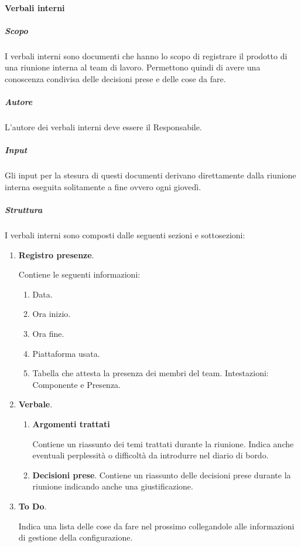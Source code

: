\paragraph{Verbali interni}

\subparagraph{Scopo}
I verbali interni sono documenti che hanno lo scopo di registrare il prodotto di una riunione interna al team di lavoro.
Permettono quindi di avere una conoscenza condivisa delle decisioni prese e delle cose da fare.

\subparagraph{Autore}
L'autore dei verbali interni deve essere il Responsabile.

\subparagraph{Input}
Gli input per la stesura di questi documenti derivano direttamente dalla riunione interna eseguita solitamente a fine  ovvero ogni giovedì.

\subparagraph{Struttura}
I verbali interni sono composti dalle seguenti sezioni e sottosezioni:
\begin{enumerate}
    \item \textbf{Registro presenze}.
    
    Contiene le seguenti informazioni:
    \begin{enumerate}
        \item Data.
        \item Ora inizio.
        \item Ora fine.
        \item Piattaforma usata.
        \item Tabella che attesta la presenza dei membri del team.
        Intestazioni: Componente e Presenza.
    \end{enumerate}
    \item \textbf{Verbale}.
    \begin{enumerate}
        \item \textbf{Argomenti trattati}
        
        Contiene un riassunto dei temi trattati durante la riunione.
        Indica anche eventuali perplessità o difficoltà da introdurre nel diario di bordo.
        \item \textbf{Decisioni prese}.
        Contiene un riassunto delle decisioni prese durante la riunione indicando anche una giustificazione.
    \end{enumerate}

    \item \textbf{To Do}.
    
    Indica una lista delle cose da fare nel prossimo  collegandole alle informazioni di gestione della configurazione.
\end{enumerate}

